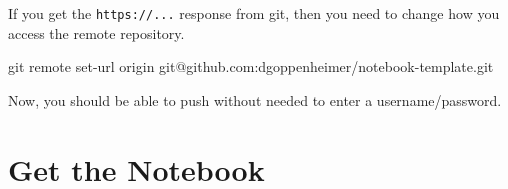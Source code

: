 \documentclass[
  letterpaper,
  DIV=11,
  numbers=noendperiod]{scrreprt}
\newenvironment{Shaded}{\begin{snugshade}}{\end{snugshade}}
\newcommand{\FunctionTok}[1]{\textcolor[rgb]{0.28,0.35,0.67}{#1}}
\newcommand{\NormalTok}[1]{\textcolor[rgb]{0.00,0.23,0.31}{#1}}
\begin{document}
If you get the \texttt{https://...} response from git, then you need to
change how you access the remote repository.

\begin{Shaded}
\begin{Highlighting}[]
\FunctionTok{git}\NormalTok{ remote set{-}url origin git@github.com:dgoppenheimer/notebook{-}template.git}
\end{Highlighting}
\end{Shaded}

Now, you should be able to push without needed to enter a
username/password.

\section{Get the Notebook}\label{get-the-notebook}
\end{document}
